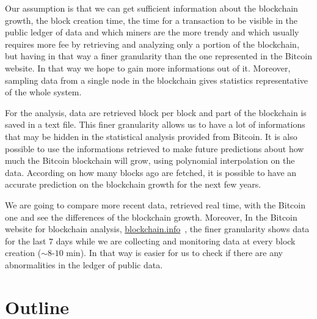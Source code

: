 \documentclass[USenglish]{uit-thesis}
\begin{document}
Our assumption is that we can get sufficient information about the
blockchain growth, the block creation time, the time for a transaction to be visible
in the public ledger of data and which miners are the more trendy and
which usually requires more fee by retrieving and analyzing only a portion
of the blockchain, but having in that way a finer
granularity than the one represented in the Bitcoin website. In that
way we hope to gain more informations out of it.
Moreover, sampling data from a single node in the blockchain gives statistics
representative of the whole system.

For the analysis, data are retrieved block per block and part of the blockchain
is saved in a text file. This finer granularity allows us to have
a lot of informations that may be hidden in the statistical analysis
provided from Bitcoin. It is also possible to use the informations retrieved
to make future predictions about how much the 
Bitcoin blockchain will grow, using polynomial interpolation on the data. According
on how many blocks ago are fetched, it is possible to have an accurate prediction
on the blockchain growth for the next few years.

We are going to compare more recent data, retrieved real time, with the Bitcoin one and see the differences of the
blockchain growth. Moreover, In the Bitcoin website for blockchain analysis,
\url{blockchain.info}~\cite{bitcoin_blockchain}, the finer granularity
shows data for the last $7$ days while we are collecting and monitoring data
at every block creation ($\sim8$-$10$ min). In that way is easier for us to check
if there are any abnormalities in the ledger of public data.

\section{Outline}
\label{sec:outline}
\end{document}
